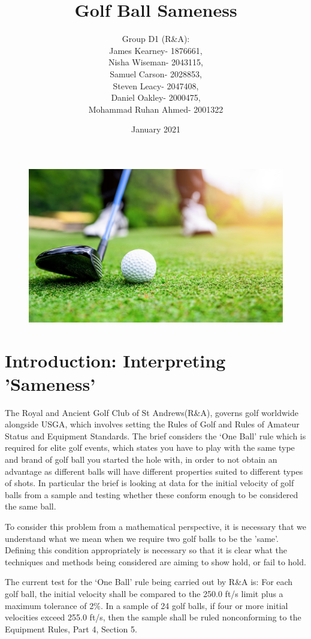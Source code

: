 \documentclass[11pt]{article}
\title{Golf Ball Sameness}
\author{Group D1 (R\&A):
\\James Kearney- 1876661,
\\Nisha Wiseman- 2043115,
\\Samuel Carson- 2028853,
\\Steven Leacy- 2047408,
\\Daniel Oakley- 2000475,
\\Mohammad Ruhan Ahmed- 2001322}
\date{January 2021}
\begin{document}
\maketitle

\begin{figure}[H]
    \centering
    \includegraphics[width=120mm]{golf.jpg}
\end{figure}

\newpage

\section{Introduction: Interpreting 'Sameness'}

The Royal and Ancient Golf Club of St Andrews(R\&A), governs golf worldwide alongside USGA, which involves setting the Rules of Golf and Rules of Amateur Status and Equipment Standards. The brief considers the ‘One Ball’ rule which is required for elite golf events, which states you have to play with the same type and brand of golf ball you started the hole with, in order to not obtain an advantage as different balls will have different properties suited to different types of shots. In particular the brief is looking at data for the initial velocity of golf balls from a sample and testing whether these conform enough to be considered the same ball.


To consider this problem from a mathematical perspective, it is necessary that we understand what we mean when we require two golf balls to be the 'same'. Defining this condition appropriately is necessary so that it is clear what the techniques and methods being considered are aiming to show hold, or fail to hold.


The current test for the ‘One Ball’ rule being carried out by R\&A is: 
For each golf ball, the initial velocity shall be compared to the 250.0 ft/s limit plus a maximum tolerance of 2$\%$. In a sample of 24 golf balls, if four or more initial velocities exceed 255.0 ft/s, then the sample shall be ruled nonconforming to the Equipment Rules, Part 4, Section 5.\cite[~pg.4]{R_A}
\end{document}
